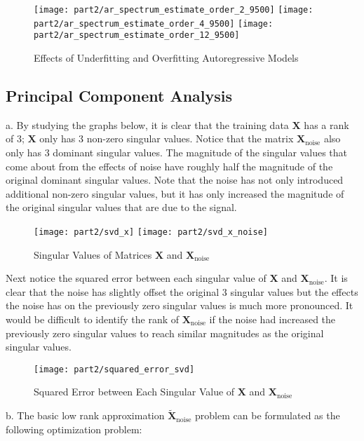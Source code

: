 \begin{figure}[H]
\centering{}
\texttt{[image: part2/ar\_spectrum\_estimate\_order\_2\_9500]}
\texttt{[image: part2/ar\_spectrum\_estimate\_order\_4\_9500]}
\texttt{[image: part2/ar\_spectrum\_estimate\_order\_12\_9500]}
\caption{Effects of Underfitting and Overfitting Autoregressive Models}
\label{fig:AR_10000}
\end{figure}

\newpage
\subsection{Principal Component Analysis}

\noindent{}a. By studying the graphs below, it is clear that the training data $\textbf{X}$ has a rank of 3; $\textbf{X}$ only has 3 non-zero singular values. Notice that the matrix $\textbf{X}_{\text{noise}}$ also only has 3 dominant singular values. The magnitude of the singular values that come about from the effects of noise have roughly half the magnitude of the original dominant singular values. Note that the noise has not only introduced additional non-zero singular values, but it has only increased the magnitude of the original singular values that are due to the signal.

\begin{figure}[H]
\centering{}
\texttt{[image: part2/svd\_x]}
\texttt{[image: part2/svd\_x\_noise]}
\caption{Singular Values of Matrices $\textbf{X}$ and $\textbf{X}_{\text{noise}}$}
\end{figure}

\noindent{}Next notice the squared error between each singular value of $\textbf{X}$ and $\textbf{X}_{\text{noise}}$. It is clear that the noise has slightly offset the original 3 singular values but the effects the noise has on the previously zero singular values is much more pronounced. It would be difficult to identify the rank of $\textbf{X}_{\text{noise}}$ if the noise had increased the previously zero singular values to reach similar magnitudes as the original singular values.

\begin{figure}[H]
\centering{}
\texttt{[image: part2/squared\_error\_svd]}
\caption{Squared Error between Each Singular Value of $\textbf{X}$ and $\textbf{X}_{\text{noise}}$}
\end{figure}

\noindent{}b. The basic low rank approximation $\tilde{\textbf{X}}_{\text{noise}}$ problem can be formulated as the following optimization problem:

